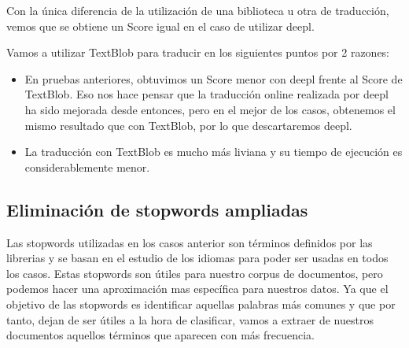 \documentclass[11pt]{article}
\begin{document}
    Con la única diferencia de la utilización de una biblioteca u otra de
traducción, vemos que se obtiene un Score igual en el caso de utilizar
deepl.

Vamos a utilizar TextBlob para traducir en los siguientes puntos por 2
razones:

\begin{itemize}
\item En pruebas anteriores, obtuvimos un Score menor con deepl frente al Score de TextBlob. Eso nos hace pensar que la traducción online realizada por deepl ha sido mejorada desde entonces, pero en el mejor de los casos, obtenemos el mismo resultado que con TextBlob, por lo que descartaremos deepl.
\item La traducción con TextBlob es mucho más liviana y su tiempo de ejecución es considerablemente menor.
\end{itemize}

    \subsection{Eliminación de stopwords ampliadas}

    Las stopwords utilizadas en los casos anterior son términos definidos
por las librerias y se basan en el estudio de los idiomas para poder ser
usadas en todos los casos. Estas stopwords son útiles para nuestro
corpus de documentos, pero podemos hacer una aproximación mas específica
para nuestros datos. Ya que el objetivo de las stopwords es identificar
aquellas palabras más comunes y que por tanto, dejan de ser útiles a la
hora de clasificar, vamos a extraer de nuestros documentos aquellos
términos que aparecen con más frecuencia.
\end{document}
